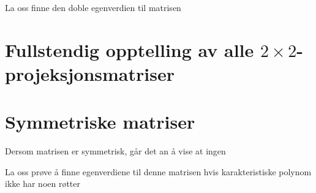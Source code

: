 \begin{ex}
La oss finne den doble egenverdien til matrisen
\end{ex}


\section*{Fullstendig opptelling av alle $2 \times 2$-projeksjonsmatriser}

\section*{Symmetriske matriser}
Dersom matrisen er symmetrisk, går det an å vise at ingen 
\begin{ex}
La oss prøve å finne egenverdiene til denne matrisen hvis karakteristiske polynom ikke har noen røtter
\end{ex}


\kapittelslutt
